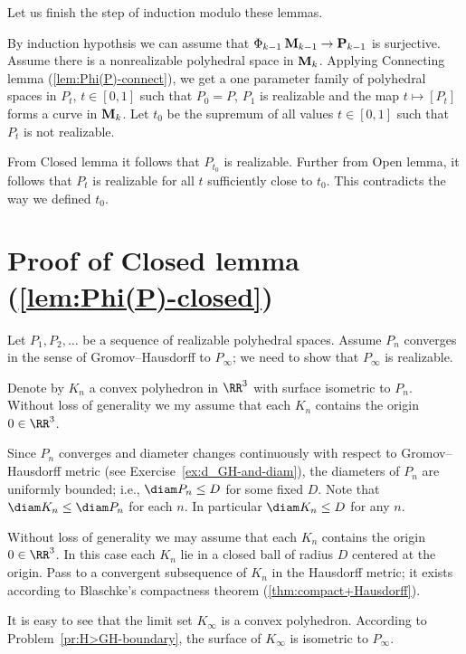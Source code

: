Let us finish the step of induction modulo these lemmas.

By induction hypothsis we can assume that 
$\Phi_{k-1}\:\text{\bf M}_{k-1}\to \text{\bf P}_{k-1}$ is surjective.
Assume there is a nonrealizable polyhedral space in $\text{\bf M}_{k}$.
Applying Connecting lemma (\ref{lem:Phi(P)-connect}), 
we get a one parameter family of polyhedral spaces in $P_t$, $t\in [0,1]$
such that
$P_0=P$, $P_1$ is realizable and the map 
$t\mapsto [P_t]$ forms a curve in $\text{\bf M}_{k}$.
Let $t_0$ be the supremum of all values $t\in [0,1]$
such that $P_t$ is not realizable.

From Closed lemma it follows that $P_{t_0}$ is realizable.
Further from Open lemma, it follows that $P_t$ is realizable for all $t$ sufficiently close to $t_0$.
This contradicts the way we defined $t_0$.
\qeds

\section{Proof of Closed lemma (\ref{lem:Phi(P)-closed})}

Let $P_1,P_2,\dots$ be a sequence of realizable polyhedral spaces.
Assume $P_n$ converges in the sense of Gromov--Hausdorff to $P_\infty$;
we need to show that $P_\infty$ is realizable.

Denote by $K_n$ a convex polyhedron in $\RR^3$ with surface isometric to $P_n$.
Without loss of generality we my assume that each $K_n$ contains the origin $0\in\RR^3$.

Since $P_n$ converges 
and diameter changes continuously with respect to Gromov--Hausdorff metric (see Exercise~\ref{ex:d_GH-and-diam}), 
the diameters of $P_n$ are uniformly bounded;
i.e., $\diam P_n\le D$ for some fixed $D$.
Note that 
$\diam K_n\le \diam P_n$
for each $n$.
In particular $\diam K_n\le D$ for any $n$.

Without loss of generality we may assume that each $K_n$ contains the origin $0\in\RR^3$.
In this case each $K_n$ lie in a closed ball of radius $D$ centered at the origin.
Pass to a convergent subsequence of $K_n$ in the Hausdorff metric;
it exists according to Blaschke's compactness theorem (\ref{thm:compact+Hausdorff}).

It is easy to see that the limit set $K_\infty$ is a convex polyhedron.
According to  Problem~\ref{pr:H>GH-boundary},
the surface of $K_\infty$ is isometric to $P_\infty$.
\qeds
















